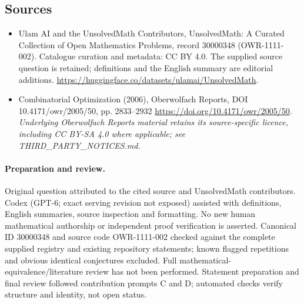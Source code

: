 \documentclass[11pt]{article}
\begin{document}
\subsection{Sources}
\begin{itemize}
\item[\hypertarget{source:30000348:1}{S1}] Ulam AI and the UnsolvedMath Contributors, UnsolvedMath: A Curated Collection of Open Mathematics Problems, record 30000348 (OWR-1111-002). Catalogue curation and metadata: CC BY 4.0. The supplied source question is retained; definitions and the English summary are editorial additions.
\url{https://huggingface.co/datasets/ulamai/UnsolvedMath}.
\item[\hypertarget{source:30000348:2}{S2}] Combinatorial Optimization (2006), Oberwolfach Reports, DOI 10.4171/owr/2005/50, pp. 2833--2932
\url{https://doi.org/10.4171/owr/2005/50}.
\textit{Underlying Oberwolfach Reports material retains its source-specific licence, including CC BY-SA 4.0 where applicable; see THIRD\_PARTY\_NOTICES.md.}
\end{itemize}
\paragraph{Preparation and review.}
Original question attributed to the cited source and UnsolvedMath contributors. Codex (GPT-6; exact serving revision not exposed) assisted with definitions, English summaries, source inspection and formatting. No new human mathematical authorship or independent proof verification is asserted. Canonical ID 30000348 and source code OWR-1111-002 checked against the complete supplied registry and existing repository statements; known flagged repetitions and obvious identical conjectures excluded. Full mathematical-equivalence/literature review has not been performed. Statement preparation and final review followed contribution prompts C and D; automated checks verify structure and identity, not open status.
\label{end:30000348}
\end{document}
